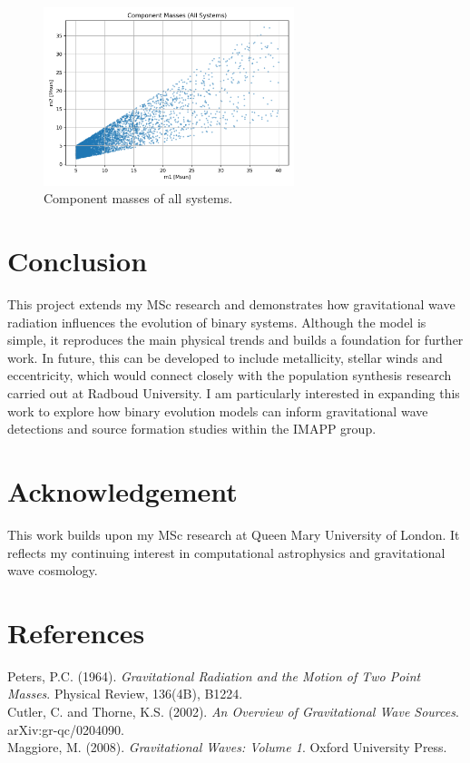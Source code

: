 \documentclass[12pt,a4paper]{article}
\begin{document}
\begin{figure}[H]

\centering
\includegraphics[width=0.65\textwidth]{mass_scatter.png}
\caption{Component masses of all systems.}
\label{fig3}
\end{figure}

\section{Conclusion}
This project extends my MSc research and demonstrates how gravitational wave radiation influences the evolution of binary systems. 
Although the model is simple, it reproduces the main physical trends and builds a foundation for further work. 
In future, this can be developed to include metallicity, stellar winds and eccentricity, which would connect closely with the population synthesis research carried out at Radboud University. 
I am particularly interested in expanding this work to explore how binary evolution models can inform gravitational wave detections and source formation studies within the IMAPP group.


\section*{Acknowledgement}
This work builds upon my MSc research at Queen Mary University of London.  
It reflects my continuing interest in computational astrophysics and gravitational wave cosmology.

\section*{References}
\noindent Peters, P.C. (1964). \textit{Gravitational Radiation and the Motion of Two Point Masses}. Physical Review, 136(4B), B1224.\\
Cutler, C. and Thorne, K.S. (2002). \textit{An Overview of Gravitational Wave Sources}. arXiv:gr-qc/0204090.\\
Maggiore, M. (2008). \textit{Gravitational Waves: Volume 1}. Oxford University Press.
\end{document}
